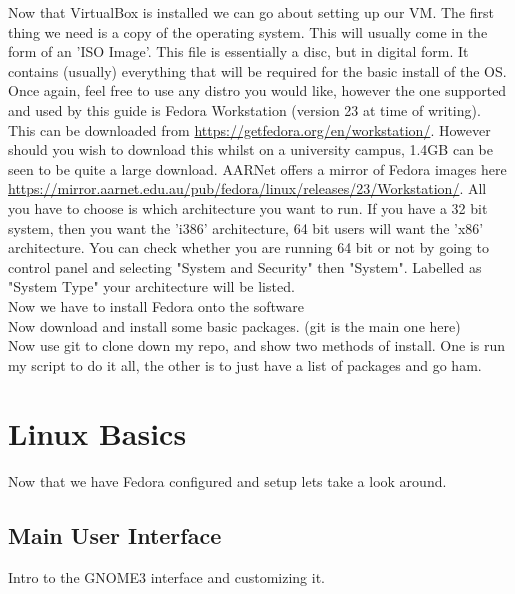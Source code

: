 \documentclass[a4paper,11pt]{report}
\begin{document}
    Now that VirtualBox is installed we can go about setting up our VM. The first thing we need is a copy of the operating system. This will usually come in the form of an 'ISO Image'. This file is essentially a disc, but in digital form.
    It contains (usually) everything that will be required for the basic install of the OS. Once again, feel free to use any distro you would like, however the one supported and used by this guide is Fedora Workstation (version 23 at time of writing).
    This can be downloaded from \url{https://getfedora.org/en/workstation/}. However should you wish to download this whilst on a university campus, 1.4GB can be seen to be quite a large download. AARNet offers a mirror of Fedora images here \url{https://mirror.aarnet.edu.au/pub/fedora/linux/releases/23/Workstation/}.
    All you have to choose is which architecture you want to run. If you have a 32 bit system, then you want the 'i386' architecture, 64 bit users will want the 'x86' architecture.
    You can check whether you are running 64 bit or not by going to control panel and selecting "System and Security" then "System". Labelled as "System Type" your architecture will be listed.\\

		Now we have to install Fedora onto the software\\

		Now download and install some basic packages. (git is the main one here)\\

		Now use git to clone down my repo, and show two methods of install. One is run my script to do it all, the other is to just have a list of packages and go ham.

	\section{Linux Basics}
		Now that we have Fedora configured and setup lets take a look around.

		\subsection{Main User Interface}
			Intro to the GNOME3 interface and customizing it.
\end{document}
